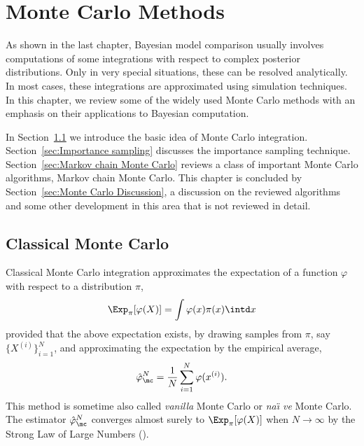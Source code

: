 \chapter{Monte Carlo Methods}
\label{cha:Monte Carlo Methods}

As shown in the last chapter, Bayesian model comparison usually involves
computations of some integrations with respect to complex posterior
distributions. Only in very special situations, these can be resolved
analytically. In most cases, these integrations are approximated using
simulation techniques. In this chapter, we review some of the widely used
Monte Carlo methods with an emphasis on their applications to Bayesian
computation.

In Section~\ref{sec:Classical Monte Carlo} we introduce the basic idea of
Monte Carlo integration. Section~\ref{sec:Importance sampling} discusses the
importance sampling technique. Section~\ref{sec:Markov chain Monte Carlo}
reviews a class of important Monte Carlo algorithms, Markov chain Monte Carlo.
This chapter is concluded by Section~\ref{sec:Monte Carlo Discussion}, a
discussion on the reviewed algorithms and some other development in this area
that is not reviewed in detail.

\section{Classical Monte Carlo}
\label{sec:Classical Monte Carlo}

Classical Monte Carlo integration approximates the expectation of a function
$\varphi$ with respect to a distribution $\pi$,
\begin{equation}
  \Exp_{\pi}[\varphi(X)] = \int\varphi(x)\pi(x)\intd x
\end{equation}
provided that the above expectation exists, by drawing \iid samples from
$\pi$, say $\{X^{(i)}\}_{i=1}^N$, and approximating the expectation by the
empirical average,
\begin{equation}
  \hat\varphi_{\mc}^N = \frac{1}{N}\sum_{i=1}^N\varphi(x^{(i)}).
  \label{eq:vanilla mc}
\end{equation}
This method is sometime also called \emph{vanilla} Monte Carlo or \emph{na\"\i
  ve} Monte Carlo. The estimator $\hat\varphi_{\mc}^N$ converges almost surely
to $\Exp_{\pi}[\varphi(X)]$ when $N\to\infty$ by the Strong Law of Large
Numbers (\slln).

